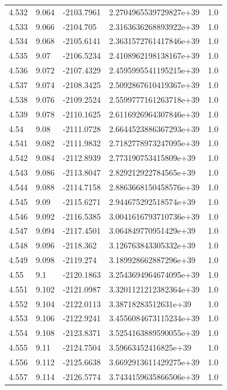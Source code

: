 \begin{tabular}{lllll}
4.532 & 9.064 & -2103.7961 & 2.2704965539729827e+39 & 1.0 \\
4.533 & 9.066 & -2104.705 & 2.3163636268893922e+39 & 1.0 \\
4.534 & 9.068 & -2105.6141 & 2.3631572761417846e+39 & 1.0 \\
4.535 & 9.07 & -2106.5234 & 2.4108962198138167e+39 & 1.0 \\
4.536 & 9.072 & -2107.4329 & 2.4595995541195215e+39 & 1.0 \\
4.537 & 9.074 & -2108.3425 & 2.5092867610419367e+39 & 1.0 \\
4.538 & 9.076 & -2109.2524 & 2.5599777161263718e+39 & 1.0 \\
4.539 & 9.078 & -2110.1625 & 2.6116926964307846e+39 & 1.0 \\
4.54 & 9.08 & -2111.0728 & 2.6644523886367293e+39 & 1.0 \\
4.541 & 9.082 & -2111.9832 & 2.7182778973247095e+39 & 1.0 \\
4.542 & 9.084 & -2112.8939 & 2.773190753415809e+39 & 1.0 \\
4.543 & 9.086 & -2113.8047 & 2.829212922784565e+39 & 1.0 \\
4.544 & 9.088 & -2114.7158 & 2.8863668150458576e+39 & 1.0 \\
4.545 & 9.09 & -2115.6271 & 2.944675292518574e+39 & 1.0 \\
4.546 & 9.092 & -2116.5385 & 3.0041616793710736e+39 & 1.0 \\
4.547 & 9.094 & -2117.4501 & 3.064849770951429e+39 & 1.0 \\
4.548 & 9.096 & -2118.362 & 3.126763843305332e+39 & 1.0 \\
4.549 & 9.098 & -2119.274 & 3.189928662887296e+39 & 1.0 \\
4.55 & 9.1 & -2120.1863 & 3.2543694964674095e+39 & 1.0 \\
4.551 & 9.102 & -2121.0987 & 3.3201121212382364e+39 & 1.0 \\
4.552 & 9.104 & -2122.0113 & 3.38718283512631e+39 & 1.0 \\
4.553 & 9.106 & -2122.9241 & 3.4556084673115234e+39 & 1.0 \\
4.554 & 9.108 & -2123.8371 & 3.5254163889590055e+39 & 1.0 \\
4.555 & 9.11 & -2124.7504 & 3.59663452416825e+39 & 1.0 \\
4.556 & 9.112 & -2125.6638 & 3.6692913611429275e+39 & 1.0 \\
4.557 & 9.114 & -2126.5774 & 3.7434159635866506e+39 & 1.0 \\

\end{tabular}
